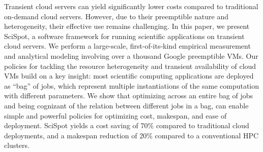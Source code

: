 Transient cloud servers can yield significantly lower costs compared to traditional on-demand cloud servers. 
However, due to their preemptible nature and heterogeneity, their effective use remains challenging.
%
In this paper, we present SciSpot, a software framework for running scientific applications on transient cloud servers.
% 
We perform a large-scale, first-of-its-kind empirical measurement and analytical modeling involving over a thousand Google preemptible VMs. 
Our policies for tackling the resource heterogeneity and transient availability of cloud VMs build on a key insight: most scientific computing applications are deployed as ``bag'' of jobs, which represent multiple instantiations of the same computation with different parameters.
We show that optimizing across an entire bag of jobs and being cognizant of the relation between different jobs in a bag, can enable simple and powerful policies for optimizing cost, makespan, and ease of deployment. 
SciSpot yields a cost saving of 70\% compared to traditional cloud deployments, and a makespan reduction of 20\% compared to a conventional HPC clusters. 

